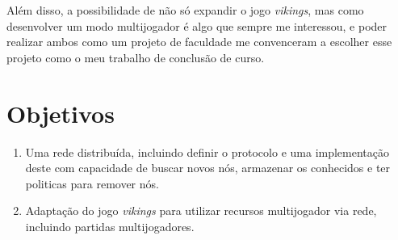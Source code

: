 Além disso, a possibilidade de não só expandir o jogo \textit{vikings}, mas como
desenvolver um modo multijogador é algo que sempre me interessou, e poder
realizar ambos como um projeto de faculdade me convenceram a escolher esse
projeto como o meu trabalho de conclusão de curso.

\section{Objetivos}
\label{sec:intr:objetivos}

\begin{enumerate}
  \item Uma rede distribuída, incluindo definir o protocolo e uma implementação deste com capacidade de 
    buscar novos nós, armazenar os conhecidos e ter politicas para remover nós.
    
  \item Adaptação do jogo \textit{vikings} para utilizar recursos multijogador via rede, incluindo partidas
    multijogadores.
\end{enumerate}






